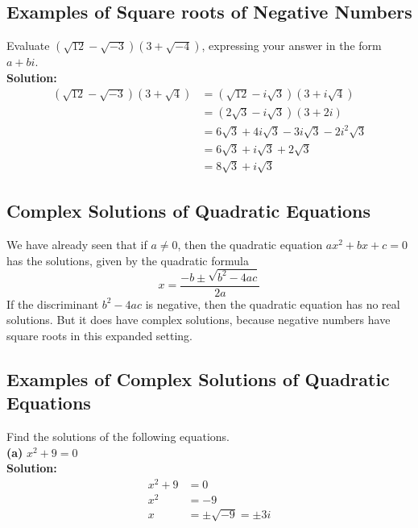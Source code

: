 \subsection{Examples of Square roots of Negative Numbers}
Evaluate $(\sqrt{12}-\sqrt{-3})(3+\sqrt{-4})$, expressing your answer in the form $a+bi$. \\
\newline
\textbf{Solution:} \\
\begin{align*}
    (\sqrt{12}-\sqrt{-3})(3+\sqrt{4}) & =(\sqrt{12}-i\sqrt{3})(3+i\sqrt{4})           \\
                                      & =(2\sqrt{3}-i\sqrt{3})(3+2i)                  \\
                                      & =6\sqrt{3}+4i\sqrt{3}-3i\sqrt{3}-2i^2\sqrt{3} \\
                                      & =6\sqrt{3}+i\sqrt{3}+2\sqrt{3}                \\
                                      & =8\sqrt{3}+i\sqrt{3}
\end{align*}


\subsection{Complex Solutions of Quadratic Equations}
We have already seen that if $a\neq0$, then the quadratic equation $ax^2+bx+c=0$ has the solutions, given by the quadratic formula $$x=\frac{-b\pm\sqrt{b^2-4ac}}{2a}$$
If the discriminant $b^2-4ac$ is negative, then the quadratic equation has no real solutions. But it does have complex solutions, because negative numbers have square roots in this expanded setting.

\subsection{Examples of Complex Solutions of Quadratic Equations}
Find the solutions of the following equations. \\
\newline
\textbf{(a)} $x^2+9=0$ \\
\textbf{Solution:} \\
\begin{align*}
    x^2+9 & =0                  \\
    x^2   & =-9                 \\
    x     & =\pm\sqrt{-9}=\pm3i
\end{align*}

